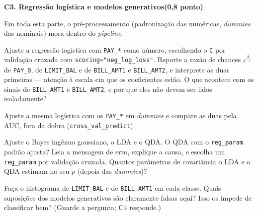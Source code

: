\documentclass[11pt,a4paper]{article}
\newcommand{\tarefa}[3]{%
  \bigskip\par\noindent
  {\large\bfseries\color{azulufrj}#1. #2}\hfill{\bfseries(#3)}\par
  \nopagebreak\vspace{0.3em}}
\newcommand{\cod}[1]{\texttt{#1}}
\begin{document}
\tarefa{C3}{Regressão logística e modelos generativos}{0,8 ponto}
Em toda esta parte, o pré-processamento (padronização das
numéricas, \emph{dummies} das nominais) mora dentro do \emph{pipeline}.

\begin{itens}
  \item Ajuste a regressão logística com \cod{PAY\_*} como número, escolhendo o
        \cod{C} por validação cruzada com \cod{scoring="neg\_log\_loss"}. Reporte a
        razão de chances $e^{\beta_j}$ de \cod{PAY\_0}, de \cod{LIMIT\_BAL} e de
        \cod{BILL\_AMT1} e \cod{BILL\_AMT2}, e interprete as duas primeiras --- atenção
        à escala em que os coeficientes estão. O que acontece com os sinais de
        \cod{BILL\_AMT1} e \cod{BILL\_AMT2}, e por que eles não devem ser lidos
        isoladamente?
  \item Ajuste a mesma logística com os \cod{PAY\_*} em \emph{dummies} e compare as
        duas pela AUC, fora da dobra (\cod{cross\_val\_predict}).
  \item Ajuste o Bayes ingênuo gaussiano, o LDA e o QDA. O QDA com o
        \cod{reg\_param} padrão ajusta? Leia a mensagem de erro, explique a causa, e
        escolha um \cod{reg\_param} por validação cruzada. Quantos parâmetros de
        covariância o LDA e o QDA estimam no seu $p$ (depois das \emph{dummies})?
  \item Faça o histograma de \cod{LIMIT\_BAL} e de \cod{BILL\_AMT1} em cada classe.
        Quais suposições dos modelos generativos são claramente falsas aqui? Isso os
        impede de classificar bem? (Guarde a pergunta; C4 responde.)
\end{itens}
\end{document}
